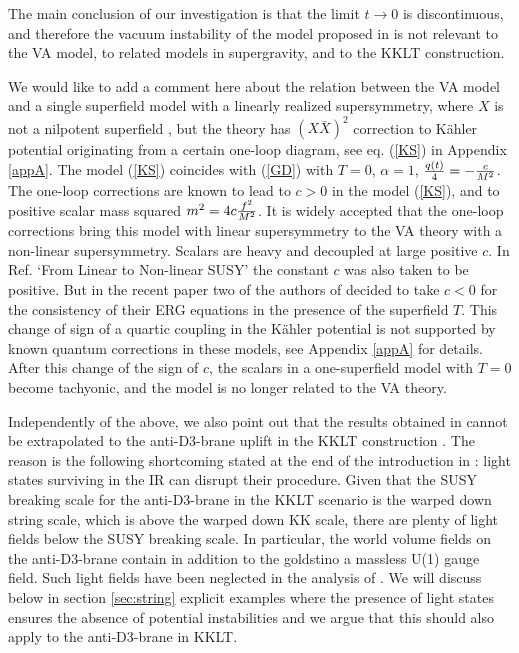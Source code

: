 \documentclass[11pt]{article}
\def\K{K{\"a}hler }
\newcommand{\rf}[1]{(\ref{#1})}
\begin{document}
The main conclusion of our investigation is that the limit $t\to 0$ is discontinuous, and therefore the vacuum instability of the model proposed in \cite{DallAgata:2022abm} is not relevant to the VA model, to related models in supergravity, and  to the KKLT construction.


We would like to add a comment here about the relation between the VA model and a single superfield model with a linearly realized supersymmetry, where $X$ is not a nilpotent superfield \cite{Komargodski:2009rz}, but the theory has $(X\bar X)^2$ correction to \K potential originating from a certain one-loop diagram,   see eq. \rf{KS} in  Appendix \ref{appA}. The model \rf{KS} coincides with   \rf{GD} with  $T=0$,  $\alpha=1$, ${q(t) \over 4} =-{c \over M^2}$.
The one-loop corrections are known to lead to  $c>0$ in the model \rf{KS},  and to positive scalar mass squared $m^2 = 4c {f^2\over M^2}$. It is widely accepted that the one-loop corrections bring this model with linear supersymmetry to the VA theory with a non-linear supersymmetry. Scalars are heavy and decoupled at large positive $c$. In Ref.  \cite{Cribiori:2017ngp}  `From Linear to Non-linear SUSY'  the constant $c$ was also taken to be positive. But in the recent paper \cite{DallAgata:2022abm} two of the authors of  \cite{Cribiori:2017ngp} decided to take  $c< 0$ for the consistency of their ERG equations in the presence of the superfield $T$. This change of sign of a quartic coupling in the \K potential is not supported by known quantum corrections in these models, see Appendix \ref{appA} for details.  After this change of the sign of $c$, the scalars in a one-superfield model with $T=0$  become tachyonic, and the model is no longer related to the VA theory. 


Independently of the above, we also point out that the results obtained in \cite{DallAgata:2022abm} cannot be extrapolated to the anti-D3-brane uplift in the KKLT construction \cite{Kachru:2003aw}. The reason is the following shortcoming stated at the end of the introduction in \cite{DallAgata:2022abm}: light states surviving in the IR can disrupt their procedure. Given that the SUSY breaking scale for the anti-D3-brane in the KKLT scenario is the warped down string scale, which is above the warped down KK scale, there are plenty of light fields below the SUSY breaking scale. In particular, the world volume fields on the anti-D3-brane contain in addition to the goldstino a massless U(1) gauge field. Such light fields have been neglected in the analysis of \cite{DallAgata:2022abm}. We will discuss below in section \ref{sec:string} explicit examples where the presence of light states ensures the absence of potential instabilities and we argue that this should also apply to the anti-D3-brane in KKLT.
\end{document}
